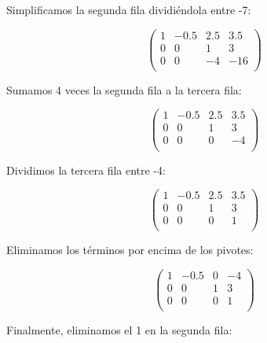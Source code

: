 \begin{solution}
Simplificamos la segunda fila dividiéndola entre -7:

\[
\begin{pmatrix}
1 & -0.5 & 2.5 & 3.5 \\
0 & 0 & 1 & 3 \\
0 & 0 & -4 & -16 \\
\end{pmatrix}
\]

Sumamos 4 veces la segunda fila a la tercera fila:

\[
\begin{pmatrix}
1 & -0.5 & 2.5 & 3.5 \\
0 & 0 & 1 & 3 \\
0 & 0 & 0 & -4 \\
\end{pmatrix}
\]

Dividimos la tercera fila entre -4:

\[
\begin{pmatrix}
1 & -0.5 & 2.5 & 3.5 \\
0 & 0 & 1 & 3 \\
0 & 0 & 0 & 1 \\
\end{pmatrix}
\]

Eliminamos los términos por encima de los pivotes:

\[
\begin{pmatrix}
1 & -0.5 & 0 & -4 \\
0 & 0 & 1 & 3 \\
0 & 0 & 0 & 1 \\
\end{pmatrix}
\]

Finalmente, eliminamos el 1 en la segunda fila:


\end{solution}

